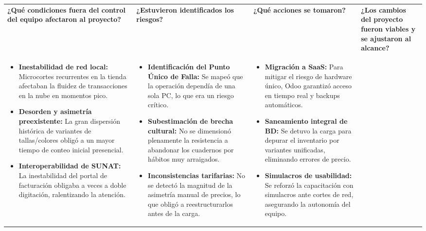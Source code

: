 \documentclass[11pt]{article}
\begin{document}
\newpage
\begin{longtable}{|p{3.8cm}|p{3.8cm}|p{3.8cm}|p{3.8cm}|}
\hline
\rowcolor{RoundGray}\multicolumn{4}{|l|}{\textbf{Tercera Ronda}} \\ \hline
\rowcolor{HeaderGray}\textbf{¿Qué condiciones fuera del control del equipo afectaron al proyecto?} & \textbf{¿Estuvieron identificados los riesgos?} & \textbf{¿Qué acciones se tomaron?} & \textbf{¿Los cambios del proyecto fueron viables y se ajustaron al alcance?} \\ \hline
\begin{itemize}[leftmargin=*,nosep]
    \item \textbf{Inestabilidad de red local:} Microcortes recurrentes en la tienda afectaban la fluidez de transacciones en la nube en momentos pico.
    \item \textbf{Desorden y asimetría preexistente:} La gran dispersión histórica de variantes de tallas/colores obligó a un mayor tiempo de conteo inicial presencial.
    \item \textbf{Interoperabilidad de SUNAT:} La inestabilidad del portal de facturación obligaba a veces a doble digitación, ralentizando la atención.
\end{itemize} &
\begin{itemize}[leftmargin=*,nosep]
    \item \textbf{Identificación del Punto Único de Falla:} Se mapeó que la operación dependía de una sola PC, lo que era un riesgo crítico.
    \item \textbf{Subestimación de brecha cultural:} No se dimensionó plenamente la resistencia a abandonar los cuadernos por hábitos muy arraigados.
    \item \textbf{Inconsistencias tarifarias:} No se detectó la magnitud de la asimetría manual de precios, lo que obligó a reestructurarlos antes de la carga.
\end{itemize} &
\begin{itemize}[leftmargin=*,nosep]
    \item \textbf{Migración a SaaS:} Para mitigar el riesgo de hardware único, Odoo garantizó acceso en tiempo real y backups automáticos.
    \item \textbf{Saneamiento integral de BD:} Se detuvo la carga para depurar el inventario por variantes unificadas, eliminando errores de precio.
    \item \textbf{Simulacros de usabilidad:} Se reforzó la capacitación con simulacros ante cortes de red, asegurando la autonomía del equipo.
\end{itemize} &

\end{longtable}
\end{document}
